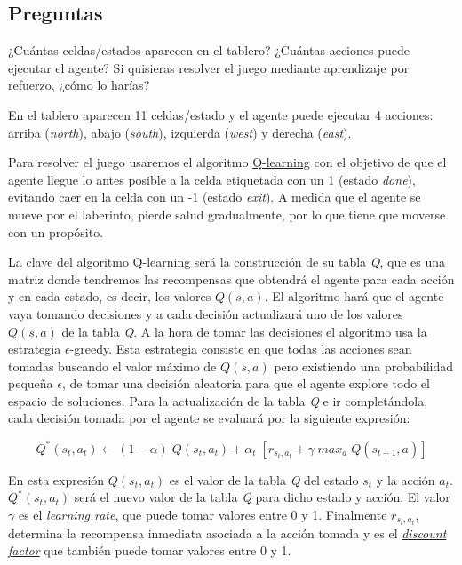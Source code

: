 \documentclass[11pt]{exam}
\begin{document}
\subsection*{Preguntas}

\begin{questions}
	
{ \question ¿Cuántas celdas/estados aparecen en el tablero? ¿Cuántas acciones puede ejecutar el agente? Si quisieras resolver el juego mediante aprendizaje por refuerzo, ¿cómo lo harías?\label{pregunta_1} 
}

En el tablero aparecen 11 celdas/estado y el agente puede ejecutar 4 acciones: arriba (\textit{north}), abajo (\textit{south}), izquierda (\textit{west}) y derecha (\textit{east}).

Para resolver el juego usaremos el algoritmo \href{https://en.wikipedia.org/wiki/Q-learning}{Q-learning} con el objetivo de que el agente llegue lo antes posible a la celda etiquetada con un 1 (estado \textit{done}), evitando caer en la celda con un -1 (estado \textit{exit}). A medida que el agente se mueve por el laberinto, pierde salud gradualmente, por lo que tiene que moverse con un propósito.

La clave del algoritmo Q-learning será la construcción de su tabla \textit{Q}, que es una matriz donde tendremos las recompensas que obtendrá el agente para cada acción y en cada estado, es decir, los valores $Q(s,a)$. El algoritmo hará que el agente vaya tomando decisiones y a cada decisión actualizará uno de los valores $Q(s,a)$ de la tabla \textit{Q}. A la hora de tomar las decisiones el algoritmo usa la estrategia \textit{$\epsilon$}-greedy. Esta estrategia consiste en que todas las acciones sean tomadas buscando el valor máximo de $Q(s,a)$ pero existiendo una probabilidad pequeña \textit{$\epsilon$}, de tomar una decisión aleatoria para que el agente explore todo el espacio de soluciones. Para la actualización de la tabla \textit{Q} e ir completándola, cada decisión tomada por el agente se evaluará por la siguiente expresión:

\begin{equation}
	Q^*(s_{t}, a_{t}) \leftarrow (1-\alpha) \; Q(s_{t}, a_{t}) + \alpha_{t} \; [r_{s_{t}, a_{t}} + \gamma \; max_{a} \; Q(s_{t + 1}, a)]
\end{equation}

En esta expresión $Q(s_{t}, a_{t})$ es el valor de la tabla \textit{Q} del estado $s_{t}$ y la acción $ a_{t}$. $Q^*(s_{t}, a_{t})$ será el nuevo valor de la tabla \textit{Q} para dicho estado y acción. El valor $\gamma$ es el \href{https://en.wikipedia.org/wiki/Learning_rate}{\textit{learning rate}}, que puede tomar valores entre 0 y 1. Finalmente $r_{s_{t}, a_{t}}$, determina la recompensa inmediata asociada a la acción tomada y es el \href{https://en.wikipedia.org/wiki/Discounting#Discount_factor}{\textit{discount factor}} que también puede tomar valores entre 0 y 1.


\end{questions}
\end{document}
